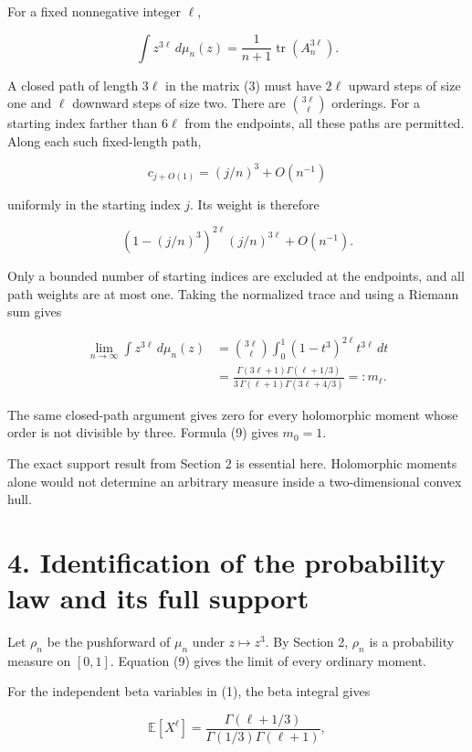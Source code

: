 \documentclass[11pt,a4paper]{article}
\begin{document}
For a fixed nonnegative integer \(\ell\),

\[
\int z^{3\ell}\,d\mu_n(z)
=\frac1{n+1}\operatorname{tr}(A_n^{3\ell}).
\tag{8}
\]

A closed path of length \(3\ell\) in the matrix (3) must have \(2\ell\)
upward steps of size one and \(\ell\) downward steps of size two. There
are \(\binom{3\ell}{\ell}\) orderings. For a starting index farther than
\(6\ell\) from the endpoints, all these paths are permitted. Along each
such fixed-length path,

\[
c_{j+O(1)}=(j/n)^3+O(n^{-1})
\]

uniformly in the starting index \(j\). Its weight is therefore

\[
(1-(j/n)^3)^{2\ell}(j/n)^{3\ell}+O(n^{-1}).
\]

Only a bounded number of starting indices are excluded at the endpoints,
and all path weights are at most one. Taking the normalized trace and
using a Riemann sum gives

\[
\begin{aligned}
\lim_{n\to\infty}\int z^{3\ell}\,d\mu_n(z)
&=\binom{3\ell}{\ell}
  \int_0^1(1-t^3)^{2\ell}t^{3\ell}\,dt\\
&=\frac{\Gamma(3\ell+1)\Gamma(\ell+1/3)}
 {3\,\Gamma(\ell+1)\Gamma(3\ell+4/3)}
=:m_\ell.
\end{aligned}
\tag{9}
\]

The same closed-path argument gives zero for every holomorphic moment
whose order is not divisible by three. Formula (9) gives \(m_0=1\).

The exact support result from Section 2 is essential here. Holomorphic
moments alone would not determine an arbitrary measure inside a
two-dimensional convex hull.

\hypertarget{1032-identification-of-the-probability-law-and-its-full-support}{%
\section{4. Identification of the probability law and its full
support}\label{1032-identification-of-the-probability-law-and-its-full-support}}

Let \(\rho_n\) be the pushforward of \(\mu_n\) under \(z\mapsto z^3\).
By Section 2, \(\rho_n\) is a probability measure on \([0,1]\). Equation
(9) gives the limit of every ordinary moment.

For the independent beta variables in (1), the beta integral gives

\[
\mathbb E[X^\ell]
=\frac{\Gamma(\ell+1/3)}
 {\Gamma(1/3)\Gamma(\ell+1)},
\]
\end{document}
